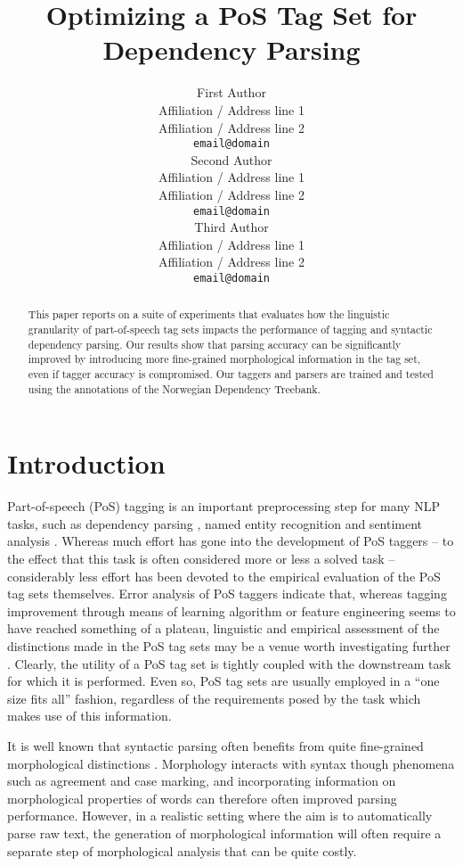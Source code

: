 \documentclass[11pt,a4paper]{article}
\title{Optimizing a PoS Tag Set for Dependency Parsing}
\author{First Author \\
  Affiliation / Address line 1 \\
  Affiliation / Address line 2 \\
  {\tt email@domain} \\\And
  Second Author \\
  Affiliation / Address line 1 \\
  Affiliation / Address line 2 \\
  {\tt email@domain}  \\\And
  Third Author \\
  Affiliation / Address line 1 \\
  Affiliation / Address line 2 \\
  {\tt email@domain} \\}
\date{}
\begin{document}
\maketitle
\begin{abstract}

This paper reports on a suite of experiments that evaluates how the linguistic
granularity of part-of-speech tag sets impacts the performance of tagging and
syntactic dependency parsing. Our results show that parsing accuracy can be
significantly improved by introducing more fine-grained morphological
information in the tag set, even if tagger accuracy is compromised. Our taggers
and parsers are  trained and tested using the annotations of the Norwegian
Dependency Treebank.

\end{abstract}


\section{Introduction}
\label{sec:intro}
Part-of-speech (PoS) tagging is an important preprocessing step for many NLP
tasks, such as dependency parsing \cite{Niv:Hal:Kub:07,Haj:Cia:Joh:09}, named
entity recognition \cite{Tjo:DeM:03} and sentiment analysis
\cite{Wil:Wie:Hof:09}. Whereas much effort has gone into the development of
PoS taggers -- to the effect that this task is often considered more or less a
solved task -- considerably less effort has been devoted to the empirical
evaluation of the PoS tag sets themselves. Error analysis of PoS taggers
indicate that, whereas tagging improvement through means of learning algorithm
or feature engineering seems to have reached something of a plateau, linguistic
and empirical assessment of the distinctions made in the PoS tag sets may be a
venue worth investigating further \cite{Man:11}. Clearly, the utility of a PoS
tag set is tightly coupled with the downstream task for which it is performed.
Even so, PoS tag sets are usually employed in a ``one size fits all'' fashion,
regardless of the requirements posed by the task which makes use of this
information.

It is well known that syntactic parsing often benefits from quite fine-grained
morphological distinctions \cite{Zha:Niv:11,See:Kuh:13}. Morphology interacts
with syntax though phenomena such as agreement and case marking, and
incorporating information on morphological properties of words can therefore
often improved parsing performance. However, in a realistic setting where the
aim is to automatically parse raw text, the generation of morphological
information will often require a separate step of morphological analysis that
can be quite costly.
\end{document}
